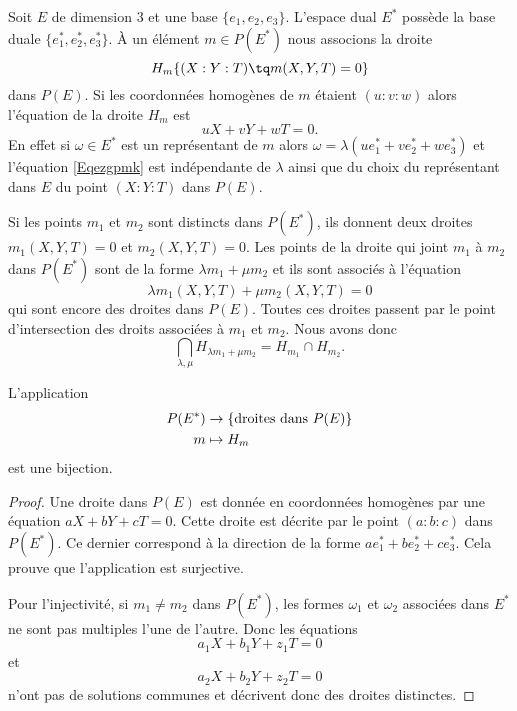 Soit \( E\) de dimension \( 3\) et une base \( \{ e_1,e_2,e_3 \}\). L'espace dual \( E^*\) possède la base duale \( \{ e_1^*,e_2^*,e_3^* \}\). À un élément \( m\in P(E^*)\) nous associons la droite
\begin{equation}
    H_m\{ (X:Y:T)\tq m(X,Y,T)=0 \}
\end{equation}
dans \( P(E)\). Si les coordonnées homogènes de \( m\) étaient \( (u:v:w)\) alors l'équation de la droite \( H_m\) est 
\begin{equation}    \label{Eqezgpmk}
    uX+vY+wT=0.
\end{equation}
En effet si \( \omega\in E^*\) est un représentant de \( m\) alors \( \omega=\lambda(ue_1^*+ve_2^*+we_3^*)\) et l'équation \eqref{Eqezgpmk} est indépendante de \( \lambda\) ainsi que du choix du représentant dans \( E\) du point \( (X:Y:T)\) dans \( P(E)\).

Si les points \( m_1\) et \( m_2\) sont distincts dans \( P(E^*)\), ils donnent deux droites \( m_1(X,Y,T)=0\) et \( m_2(X,Y,T)=0\). Les points de la droite qui joint \( m_1\) à \( m_2\) dans \( P(E^*)\) sont de la forme \( \lambda m_1+\mu m_2\) et ils sont associés à l'équation
\begin{equation}
    \lambda m_1(X,Y,T)+\mu m_2(X,Y,T)=0
\end{equation}
qui sont encore des droites dans \( P(E)\). Toutes ces droites passent par le point d'intersection des droits associées à \( m_1\) et \( m_2\). Nous avons donc
\begin{equation}
    \bigcap_{\lambda,\mu}H_{\lambda m_1+\mu m_2}=H_{m_1}\cap H_{m_2}.
\end{equation}

\begin{lemma}
    L'application
    \begin{equation}
        \begin{aligned}
            P(E^*)&\to \{ \text{droites dans \( P(E)\)} \} \\
            m&\mapsto H_m 
        \end{aligned}
    \end{equation}
    est une bijection.
\end{lemma}

\begin{proof}
    Une droite dans \( P(E)\) est donnée en coordonnées homogènes par une équation \( aX+bY+cT=0\). Cette droite est décrite par le point \( (a:b:c)\) dans \( P(E^*)\). Ce dernier correspond à la direction de la forme \( ae_1^*+be_2^*+ce_3^*\). Cela prouve que l'application est surjective.

    Pour l'injectivité, si \( m_1\neq m_2\) dans \( P(E^*)\), les formes \( \omega_1\) et \( \omega_2\) associées dans \( E^*\) ne sont pas multiples l'une de l'autre. Donc les équations
    \begin{equation}
        a_1X+b_1Y+z_1T=0
    \end{equation}
    et
    \begin{equation}
        a_2X+b_2Y+z_2T=0
    \end{equation}
    n'ont pas de solutions communes et décrivent donc des droites distinctes.
\end{proof}

